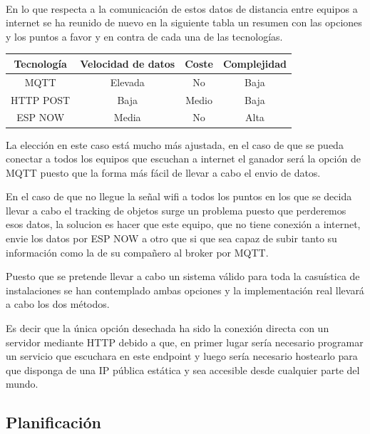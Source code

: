 \documentclass[a4paper ,12pt, onecolumn]{article}
\begin{document}
        \paragraph{}
        En lo que respecta a la comunicación de estos datos de distancia entre equipos a internet se ha reunido de nuevo en la 
        siguiente tabla un resumen con las opciones y los puntos a favor y en contra de cada una de las tecnologías.
        \begin{center}
            \begin{tabular}{||c | c| c| c||} 
            \hline
            Tecnología  & Velocidad de datos & Coste & Complejidad \\ [0.5ex] 
            \hline
            MQTT& Elevada  & No & Baja\\
            HTTP POST& Baja & Medio & Baja\\ 
            ESP NOW& Media & No & Alta\\ 
            \hline
            \end{tabular}
        \end{center}   
        La elección en este caso está mucho más ajustada, en el caso de que se pueda conectar a todos los equipos que 
        escuchan a internet el ganador será la opción de MQTT puesto que la forma más fácil de llevar a cabo el envio de datos.

        En el caso de que no llegue la señal wifi a todos los puntos en los que se decida llevar a cabo el tracking de objetos 
        surge un problema puesto que perderemos esos datos, la solucion es hacer que este equipo, que no tiene conexión a internet,
        envie los datos por ESP NOW a otro que si que sea capaz de subir tanto su información como la de su compañero al broker por MQTT.

        Puesto que se pretende llevar a cabo un sistema válido para toda la casuística de instalaciones se han contemplado ambas opciones
        y la implementación real llevará a cabo los dos métodos.
        
        Es decir que la única opción desechada ha sido la conexión directa con un servidor mediante HTTP debido a que, en primer
        lugar sería necesario programar un servicio que escuchara en este endpoint y luego sería necesario hostearlo 
        para que disponga de una IP pública estática y sea accesible desde cualquier parte del mundo.
    \subsection{Planificación}
\end{document}
